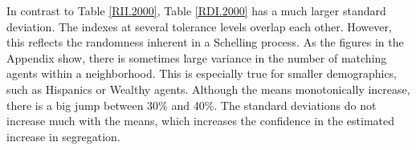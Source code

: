 {In contrast to Table \ref{RII.2000}, Table \ref{RDI.2000} has a much larger standard deviation. The indexes at several tolerance levels overlap each other. However, this reflects the randomness inherent in a Schelling process. As the figures in the Appendix show, there is sometimes large variance in the number of matching agents within a neighborhood. This is especially true for smaller demographics, such as Hispanics or Wealthy agents. Although the means monotonically increase, there is a big jump between 30\% and 40\%. The standard deviations do not increase much with the means, which increases the confidence in the estimated increase in segregation.

\begin{table}[h!]
\centering
\caption[Racial Isolation, 2010 makeup of Chicago]{Racial Isolation Index for varying Tolerance levels in 2010 makeup of Chicago}
\label{RII.2010}
\end{table}}
